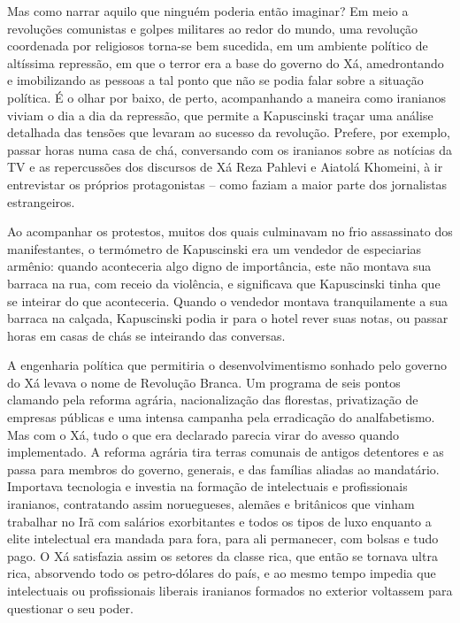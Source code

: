 Mas como narrar aquilo que ninguém poderia então imaginar? Em meio a
revoluções comunistas e golpes militares ao redor do mundo, uma
revolução coordenada por religiosos torna-se bem sucedida, em um
ambiente político de altíssima repressão, em que o terror era a base do
governo do Xá, amedrontando e imobilizando as pessoas a tal ponto que
não se podia falar sobre a situação política. É o olhar por baixo, de
perto, acompanhando a maneira como iranianos viviam o dia a dia da
repressão, que permite a Kapuscinski traçar uma análise detalhada das
tensões que levaram ao sucesso da revolução. Prefere, por exemplo,
passar horas numa casa de chá, conversando com os iranianos sobre as
notícias da TV e as repercussões dos discursos de Xá Reza Pahlevi e
Aiatolá Khomeini, à ir entrevistar os próprios protagonistas -- como
faziam a maior parte dos jornalistas estrangeiros.

Ao acompanhar os protestos, muitos dos quais culminavam no frio
assassinato dos manifestantes, o termómetro de Kapuscinski era um
vendedor de especiarias armênio: quando aconteceria algo digno de
importância, este não montava sua barraca na rua, com receio da
violência, e significava que Kapuscinski tinha que se inteirar do que
aconteceria. Quando o vendedor montava tranquilamente a sua barraca na
calçada, Kapuscinski podia ir para o hotel rever suas notas, ou passar
horas em casas de chás se inteirando das conversas.

A engenharia política que permitiria o desenvolvimentismo sonhado pelo
governo do Xá levava o nome de Revolução Branca. Um programa de seis
pontos clamando pela reforma agrária, nacionalização das florestas,
privatização de empresas públicas e uma intensa campanha pela
erradicação do analfabetismo. Mas com o Xá, tudo o que era declarado
parecia virar do avesso quando implementado. A reforma agrária tira
terras comunais de antigos detentores e as passa para membros do
governo, generais, e das famílias aliadas ao mandatário. Importava
tecnologia e investia na formação de intelectuais e profissionais
iranianos, contratando assim noruegueses, alemães e britânicos que
vinham trabalhar no Irã com salários exorbitantes e todos os tipos de
luxo enquanto a elite intelectual era mandada para fora, para ali
permanecer, com bolsas e tudo pago. O Xá satisfazia assim os setores da
classe rica, que então se tornava ultra rica, absorvendo todo os
petro-dólares do país, e ao mesmo tempo impedia que intelectuais ou
profissionais liberais iranianos formados no exterior voltassem para
questionar o seu poder.

